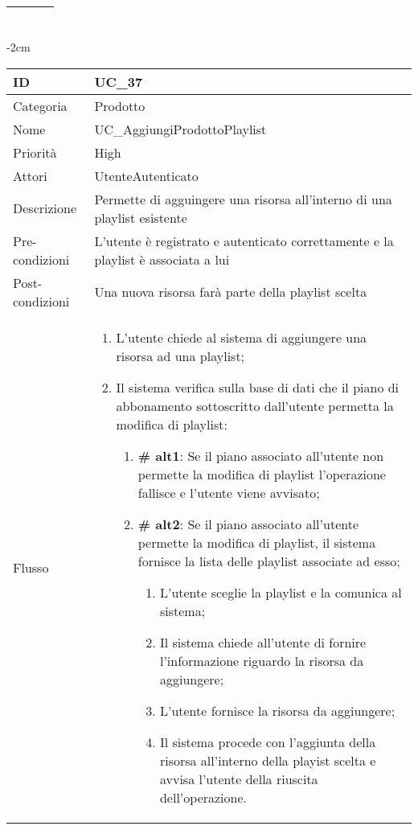 \begin{center}
\begin{table}[bp]
\begin{tabular}{ |p{2.6cm}|p{13cm}|  }
\begin{enumerate}
		\end{enumerate}\\\hline
\end{tabular}
\label{table_use_case:36}\newline
\end{table}

\begin{table}[bp]
    \centering
    \addtolength{\leftskip} {-2cm}
\begin{tabular}{ |p{2.6cm}|p{13cm}|  }
\hline
ID & UC\_37 \\\hline
Categoria & Prodotto \\\hline
Nome & UC\_AggiungiProdottoPlaylist\\\hline
Priorità & High \\\hline
Attori &  UtenteAutenticato \\\hline
Descrizione & Permette di agguingere una risorsa all'interno di una playlist esistente\\\hline
Pre-condizioni & L'utente è registrato e autenticato correttamente e la playlist è associata a lui\\\hline
Post-condizioni & Una nuova risorsa farà parte della playlist scelta\\\hline
Flusso &  	\vspace{-5mm} \begin{enumerate}
\item L'utente chiede al sistema di aggiungere una risorsa ad una playlist;
		\item Il sistema verifica sulla base di dati che il piano di abbonamento sottoscritto dall'utente permetta la modifica di playlist:
		 \begin{enumerate}[label*=\arabic*.]
			\item \textbf{\# alt1}: Se il piano associato all'utente non permette la modifica di playlist l'operazione fallisce e l'utente viene avvisato;
			\item \textbf{\# alt2}: Se il piano associato all'utente permette la modifica di playlist, il sistema  fornisce la lista delle playlist associate ad esso;
			\begin{enumerate}[label*=\arabic*.]
				\item L'utente sceglie la playlist e la comunica al sistema;	
				\item Il sistema chiede all'utente di fornire l'informazione riguardo la risorsa da aggiungere;
				\item L'utente fornisce la risorsa da aggiungere;
				\item Il sistema procede con l'aggiunta della risorsa all'interno della playist scelta e avvisa l'utente della riuscita dell'operazione.
			\end{enumerate}
					\end{enumerate}


\end{enumerate}
\end{tabular}
\end{table}
\end{center}

